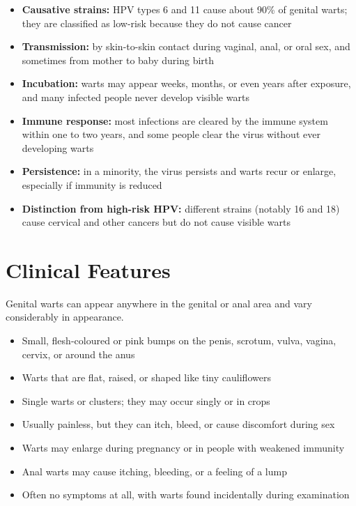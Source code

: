 \begin{itemize}
    \item \textbf{Causative strains:} HPV types 6 and 11 cause about 90\% of genital warts; they are classified as low-risk because they do not cause cancer
    \item \textbf{Transmission:} by skin-to-skin contact during vaginal, anal, or oral sex, and sometimes from mother to baby during birth
    \item \textbf{Incubation:} warts may appear weeks, months, or even years after exposure, and many infected people never develop visible warts
    \item \textbf{Immune response:} most infections are cleared by the immune system within one to two years, and some people clear the virus without ever developing warts
    \item \textbf{Persistence:} in a minority, the virus persists and warts recur or enlarge, especially if immunity is reduced
    \item \textbf{Distinction from high-risk HPV:} different strains (notably 16 and 18) cause cervical and other cancers but do not cause visible warts
\end{itemize}

\section*{Clinical Features}
Genital warts can appear anywhere in the genital or anal area and vary considerably in appearance.

\begin{itemize}
    \item Small, flesh-coloured or pink bumps on the penis, scrotum, vulva, vagina, cervix, or around the anus
    \item Warts that are flat, raised, or shaped like tiny cauliflowers
    \item Single warts or clusters; they may occur singly or in crops
    \item Usually painless, but they can itch, bleed, or cause discomfort during sex
    \item Warts may enlarge during pregnancy or in people with weakened immunity
    \item Anal warts may cause itching, bleeding, or a feeling of a lump
    \item Often no symptoms at all, with warts found incidentally during examination
\end{itemize}

